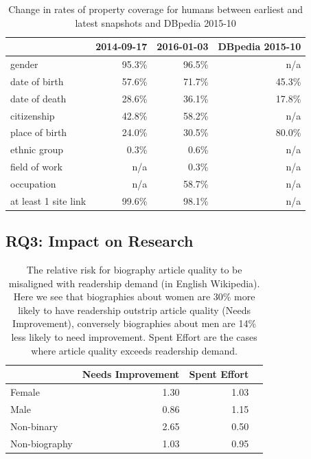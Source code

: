 \documentclass{sig-alternate-05-2015}
\begin{document}
\begin{table}
\caption{Change in rates of property coverage for humans between earliest and latest snapshots and DBpedia 2015-10}
\begin{tabular}{lrrr}
\toprule
{} &  2014-09-17 &  2016-01-03 & DBpedia 2015-10\\
\midrule
gender               &       95.3\% &       96.5\% & n/a \\
date of birth        &       57.6\% &       71.7\% & 45.3\% \\
date of death        &       28.6\% &       36.1\% & 17.8\% \\
citizenship          &       42.8\% &       58.2\% & n/a \\
place of birth       &       24.0\% &       30.5\% & 80.0\% \\
ethnic group         &        0.3\% &        0.6\% & n/a \\
field of work        &        n/a &        0.3\% & n/a \\
occupation           &        n/a &       58.7\% & n/a \\
at least 1 site link &       99.6\% &       98.1\% & n/a \\
\bottomrule
\end{tabular}
\label{table:accompanying}
\end{table}

\subsection{RQ3: Impact on Research}

\begin{table}
\caption{The relative risk for biography article quality to be misaligned with readership demand (in English Wikipedia). Here we see that biographies about women are 30\% more likely to have readership outstrip article quality (Needs Improvement), conversely biographies about men are 14\% less likely to need improvement. Spent Effort are the cases where article quality exceeds readership demand.}
\begin{tabular}{lrrr}
\toprule
{} &  Needs Improvement &  Spent Effort \\
\midrule
Female        &               1.30 &          1.03 \\
Male          &               0.86 &          1.15 \\
Non-binary    &               2.65 &          0.50 \\
Non-biography &               1.03 &          0.95 \\
\bottomrule
\end{tabular}
\label{table:pah}
\end{table}
\end{document}
